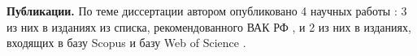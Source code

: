 \textbf{Публикации.}
По теме диссертации автором опубликовано 4 научных работы \cite{korsun2016automatic,poliyev2017pca,korsun2018usage,korsun2018optimal}: 3 из них в изданиях из списка, рекомендованного ВАК РФ \cite{korsun2016automatic,poliyev2017pca,korsun2018usage}, и 2 из них в изданиях, входящих в базу Scopus и базу Web of Science \cite{korsun2016automatic,korsun2018optimal}.

